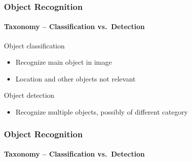 \documentclass[xetex,professionalfont]{beamer}
\renewcommand\emph[1]{\textcolor{tuwcvl_inf_red}{#1}}
\begin{document}

\begin{frame}
\frametitle{Object Recognition}
\framesubtitle{Taxonomy -- Classification vs.\ Detection}

\emph{Object classification}
\begin{itemize}
	\item Recognize main object in image %
	\item Location and other objects not relevant
\end{itemize}

\bigskip
\emph{Object detection}
\begin{itemize}
	\item Recognize multiple objects, possibly of different category
\end{itemize}

\end{frame}


\begin{frame}
\frametitle{Object Recognition}
\framesubtitle{Taxonomy -- Classification vs.\ Detection}

\begin{center}
\end{center}

\end{frame}
\end{document}
